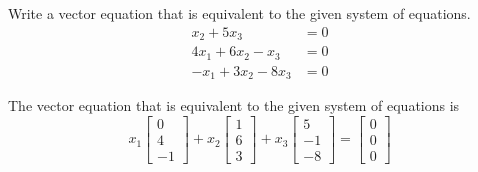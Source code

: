 \documentclass{mathhomework}
\begin{document}
\begin{problem}[1.3\#9]
    Write a vector equation that is equivalent to the given system of equations.
    \begin{align*}
        x_2 + 5x_3 &= 0 \\
        4x_1 + 6x_2 - x_3 &= 0 \\
        -x_1 + 3x_2 - 8x_3 &= 0
    \end{align*}

    \begin{solution}
        The vector equation that is equivalent to the given system of equations is
        \begin{equation*}
            x_1 \begin{bmatrix}
                0 \\ 4 \\ -1
            \end{bmatrix} + x_2 \begin{bmatrix}
                1 \\ 6 \\ 3
            \end{bmatrix} + x_3 \begin{bmatrix}
                5 \\ -1 \\ -8
            \end{bmatrix} = \begin{bmatrix}
                0 \\ 0 \\ 0
            \end{bmatrix}
        \end{equation*}
    \end{solution}
\end{problem}
\end{document}
